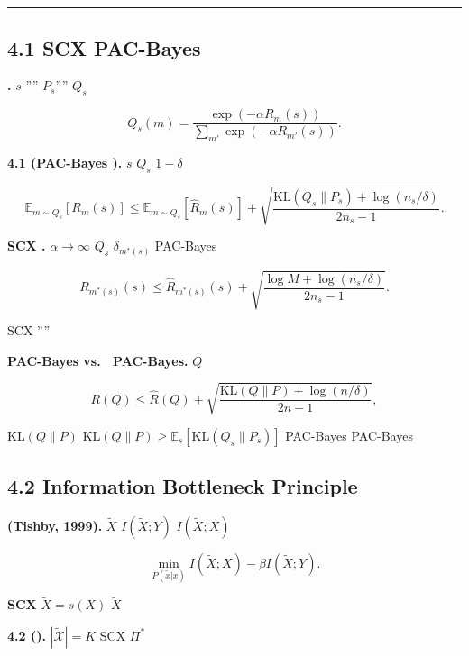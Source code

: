 \documentclass[
  12pt,
]{article}
\begin{document}
\section{}\label{ux7b2cux56dbux90e8ux5206ux4e0eux73b0ux6709ux7406ux8bbaux7684ux8fdeux63a5}

\begin{center}\rule{0.5\linewidth}{0.5pt}\end{center}

\subsection{4.1 SCX  PAC-Bayes}\label{scx-ux5d4cux5165-pac-bayes}

\textbf{.}  \(s\) ''''
\(P_s\)'''' \(Q_s\)

\[Q_s(m) = \frac{\exp(-\alpha R_m(s))}{\sum_{m'} \exp(-\alpha R_{m'}(s))}.\]

\textbf{ 4.1 (PAC-Bayes ).}  \(s\) \(Q_s\)
 \(1-\delta\) 

\[\mathbb{E}_{m \sim Q_s}[R_m(s)] \leq \mathbb{E}_{m \sim Q_s}[\hat{R}_m(s)] + \sqrt{\frac{\text{KL}(Q_s \| P_s) + \log(n_s/\delta)}{2n_s - 1}}.\]

\textbf{SCX .}  \(\alpha \to \infty\) \(Q_s\) 
\(\delta_{m^*(s)}\) PAC-Bayes 

\[R_{m^*(s)}(s) \leq \hat{R}_{m^*(s)}(s) + \sqrt{\frac{\log M + \log(n_s/\delta)}{2n_s - 1}}.\]

 SCX ''''

\textbf{ PAC-Bayes vs.~ PAC-Bayes.}  \(Q\)

\[R(Q) \leq \hat{R}(Q) + \sqrt{\frac{\text{KL}(Q \| P) + \log(n/\delta)}{2n - 1}},\]

 \(\text{KL}(Q \| P)\) 
\(\text{KL}(Q \| P) \geq \mathbb{E}_s[\text{KL}(Q_s \| P_s)]\)
PAC-Bayes  PAC-Bayes 

\subsection{4.2  Information Bottleneck Principle
}\label{ux4e0e-information-bottleneck-principle-ux7684ux5173ux7cfb}

\textbf{ (Tishby, 1999).}  \(\tilde{X}\) 
\(I(\tilde{X}; Y)\)  \(I(\tilde{X}; X)\)

\[\min_{P(\tilde{x}|x)} I(\tilde{X}; X) - \beta I(\tilde{X}; Y).\]

\textbf{SCX
}\textbf{}\(\tilde{X} = s(X)\)
\(\tilde{X}\) 

\textbf{ 4.2 ().}  \(|\tilde{\mathcal{X}}| = K\) SCX
 \(\Pi^*\) 
\end{document}
